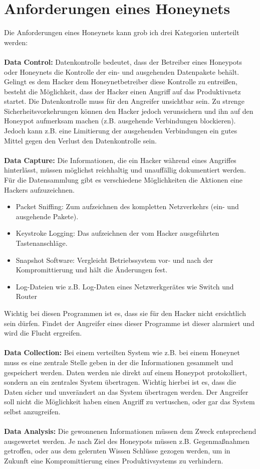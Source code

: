 \section{Anforderungen eines Honeynets}
\noindent Die Anforderungen eines Honeynets kann grob ich drei Kategorien unterteilt werden:\\
\\
\textbf{Data Control: }Datenkontrolle bedeutet, dass der Betreiber eines Honeypots oder Honeynets die Kontrolle der ein- und ausgehenden Datenpakete behält. Gelingt es dem Hacker dem Honeynetbetreiber diese Kontrolle zu entreißen, besteht die Möglichkeit, dass der Hacker einen Angriff auf das Produktivnetz startet. 
Die Datenkontrolle muss für den Angreifer unsichtbar sein. Zu strenge Sicherheitsvorkehrungen können den Hacker jedoch verunsichern und ihn auf den Honeypot aufmerksam machen (z.B. ausgehende Verbindungen blockieren). Jedoch kann z.B. eine Limitierung der ausgehenden Verbindungen ein gutes Mittel gegen den Verlust den Datenkontrolle sein. \\
\\
\textbf{Data Capture: }Die Informationen, die ein Hacker während eines Angriffes hinterlässt, müssen möglichst reichhaltig und unauffällig dokumentiert werden. Für die Datensammlung gibt es verschiedene Möglichkeiten die Aktionen eine Hackers aufzuzeichnen.
\begin{itemize}
\item Packet Sniffing: Zum aufzeichnen des kompletten Netzverkehrs (ein- und ausgehende Pakete).
\item Keystroke Logging: Das aufzeichnen der vom Hacker ausgeführten Tastenanschläge.
\item Snapshot Software: Vergleicht Betriebssystem vor- und nach der Kompromittierung und hält die Änderungen fest.
\item Log-Dateien wie z.B. Log-Daten eines Netzwerkgerätes wie Switch und Router
\end{itemize} 
Wichtig bei diesen Programmen ist es, dass sie für den Hacker nicht ersichtlich sein dürfen. Findet der Angreifer eines dieser Programme ist dieser alarmiert und wird die Flucht ergreifen.\\
\\
\textbf{Data Collection: }Bei einem verteilten System wie z.B. bei einem Honeynet muss es eine zentrale Stelle geben in der die Informationen gesammelt und gespeichert werden. Daten werden nie direkt auf einem Honeypot protokolliert, sondern an ein zentrales System übertragen. Wichtig hierbei ist es, dass die Daten sicher und unverändert an das System übertragen werden. Der Angreifer soll nicht die Möglichkeit haben einen Angriff zu vertuschen, oder gar das System selbst anzugreifen. \\
\\
\textbf{Data Analysis: }Die gewonnenen Informationen müssen dem Zweck entsprechend ausgewertet werden. Je nach Ziel des Honeypots müssen z.B. Gegenmaßnahmen getroffen, oder aus dem gelernten Wissen Schlüsse gezogen werden, um in Zukunft eine Kompromittierung eines Produktivsystems zu verhindern.
